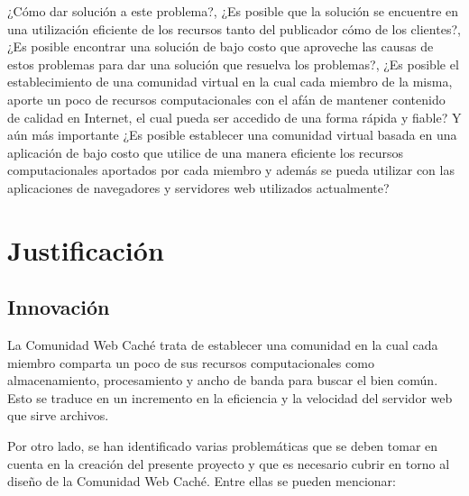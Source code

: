 ¿Cómo dar solución a este problema?, ¿Es posible que la solución se encuentre en una utilización eficiente de los recursos tanto del publicador cómo de los clientes?, ¿Es posible encontrar una solución de bajo costo que aproveche las causas de estos problemas para dar una solución que resuelva los problemas?, ¿Es posible el establecimiento de una comunidad virtual en la cual cada miembro de la misma, aporte un poco de recursos computacionales con el afán de mantener contenido de calidad en Internet, el cual pueda ser accedido de una forma rápida y fiable? Y aún más importante ¿Es posible establecer una comunidad virtual basada en una aplicación de bajo costo que utilice de una manera eficiente los recursos computacionales aportados por cada miembro y además se pueda utilizar con las aplicaciones de navegadores y servidores web utilizados actualmente?

\section{Justificación}

\subsection{Innovación}
La Comunidad Web Caché trata de establecer una comunidad en la cual cada miembro comparta un poco de sus recursos computacionales como almacenamiento, procesamiento y ancho de banda para buscar el bien común. Esto se traduce en un incremento en la eficiencia y la velocidad del servidor web que sirve archivos.

Por otro lado, se han identificado varias problemáticas que se deben tomar en cuenta en la creación del presente proyecto y que es necesario cubrir en torno al diseño de la Comunidad Web Caché. Entre ellas se pueden mencionar:

